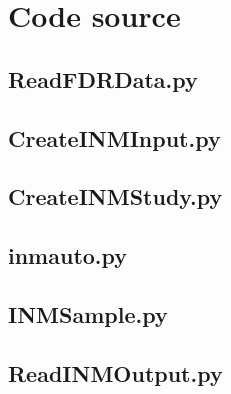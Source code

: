 \documentclass[a4paper]{article}
\begin{document}
    \section{Code source}
    \subsection{ReadFDRData.py}
    \subsection{CreateINMInput.py}
    \subsection{CreateINMStudy.py}
    \subsection{inmauto.py}
    \subsection{INMSample.py}
    \subsection{ReadINMOutput.py}
    \newpage
    
    
    
\end{document}
